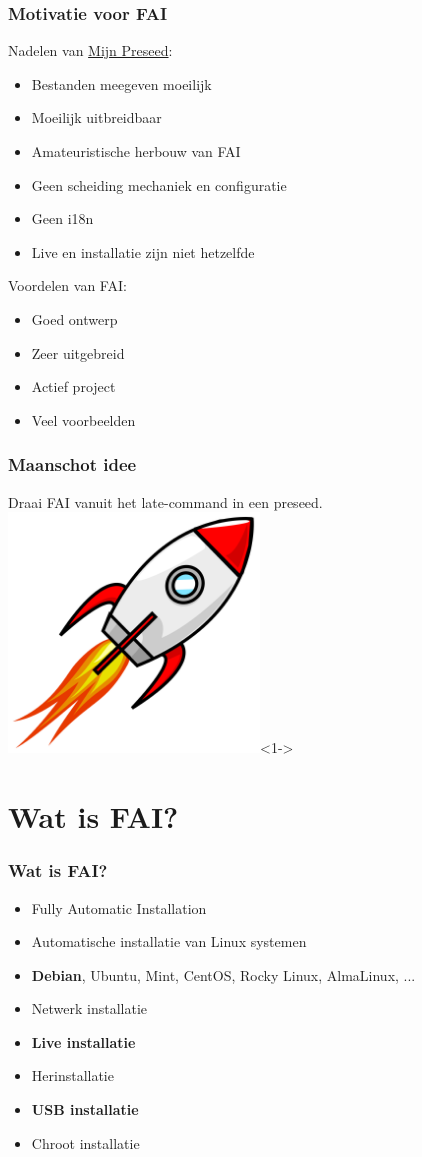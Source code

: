 \documentclass{beamer}
\begin{document}
\begin{frame}
\frametitle{Motivatie voor FAI}
Nadelen van \href{https://slspeek.github.io/debian/}{Mijn Preseed}:
\begin{itemize}
  \item Bestanden meegeven moeilijk
  \item Moeilijk uitbreidbaar
  \item Amateuristische herbouw van FAI
  \item Geen scheiding mechaniek en configuratie
  \item Geen i18n
  \item Live en installatie zijn niet hetzelfde
\end{itemize}
Voordelen van FAI:
\begin{itemize}
  \item Goed ontwerp
  \item Zeer uitgebreid
  \item Actief project
  \item Veel voorbeelden
\end{itemize}
\end{frame}

\begin{frame}
\frametitle{Maanschot idee}
Draai FAI vanuit het late-command in een preseed.
\centering
\includegraphics[width=0.5\textwidth]{img/Cartoon_space_rocket.png}<1->
\end{frame}

\section{Wat is FAI?}
\begin{frame}
\frametitle{Wat is FAI?}
\begin{itemize}
  \item Fully Automatic Installation
  \item Automatische installatie van Linux systemen
  \item \textbf{Debian}, Ubuntu, Mint, CentOS, Rocky Linux, AlmaLinux, ...
  \item Netwerk installatie
  \item \textbf{Live installatie}
  \item Herinstallatie
  \item \textbf{USB installatie}
  \item Chroot installatie
\end{itemize}
\end{frame}
\end{document}
